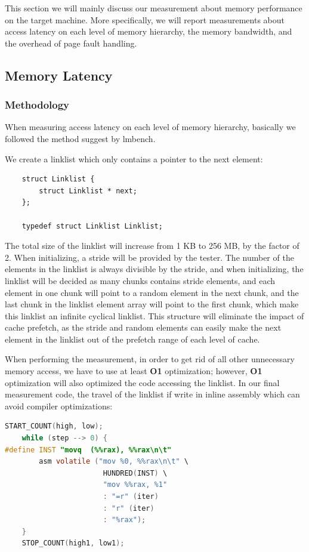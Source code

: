 
% 

This section we will mainly discuss our measurement about memory performance on the target machine. More specifically, we will report measurements about access latency on each level of memory hierarchy, the memory bandwidth, and the overhead of page fault handling.

\subsection{Memory Latency}

\subsubsection{Methodology}

When measuring access latency on each level of memory hierarchy, basically we followed the method suggest by lmbench\cite{mcvoy1996lmbench}.

We create a linklist which only contains a pointer to the next element:

\begin{lstlisting}
    struct Linklist {
        struct Linklist * next;
    };

    typedef struct Linklist Linklist;
\end{lstlisting}

The total size of the linklist will increase from 1 KB to 256 MB, by the factor of 2. When initializing, a stride will be provided by the tester. The number of the elements in the linklist is always divisible by the stride, and when initializing, the linklist will be decided as many chunks contains stride elements, and each element in one chunk will point to a random element in the next chunk, and the last chunk in the linklist element array will point to the first chunk, which make this linklist an infinite cyclical linklist. This structure will eliminate the impact of cache prefetch, as the stride and random elements can easily make the next element in the linklist out of the prefetch range of each level of cache.

When performing the measurement, in order to get rid of all other unnecessary memory access, we have to use at least \textbf{O1} optimization; however, \textbf{O1} optimization will also optimized the code accessing the linklist. In our final measurement code, the travel of the linklist if write in inline assembly which can avoid compiler optimizations:

\begin{lstlisting}[language=C]
    START_COUNT(high, low);
    while (step --> 0) {
#define INST "movq	(%%rax), %%rax\n\t"
        asm volatile ("mov %0, %%rax\n\t" \
                       HUNDRED(INST) \
                       "mov %%rax, %1"
                       : "=r" (iter)
                       : "r" (iter)
                       : "%rax");
    }
    STOP_COUNT(high1, low1);
\end{lstlisting}


